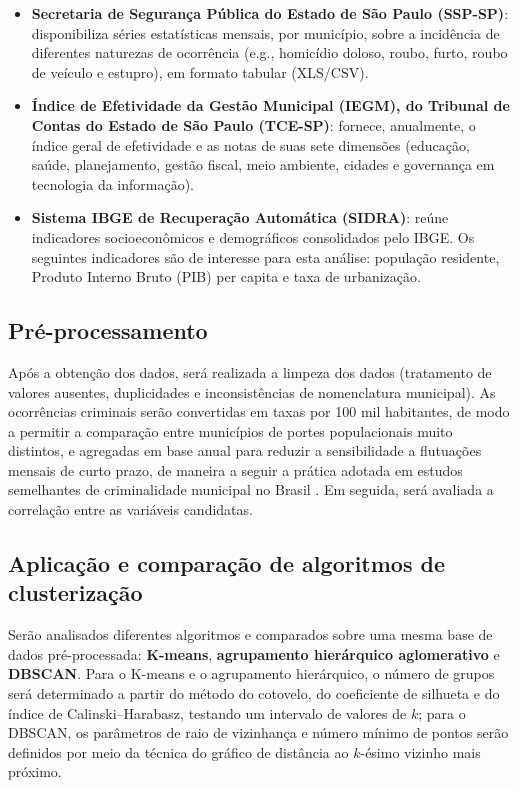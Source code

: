 \documentclass[12pt]{article}
\begin{document}
\begin{itemize}
\item \textbf{Secretaria de Segurança Pública do Estado de São Paulo (SSP-SP)}: disponibiliza séries estatísticas mensais, por município, sobre a incidência de diferentes naturezas de ocorrência (e.g., homicídio doloso, roubo, furto, roubo de veículo e estupro), em formato tabular (XLS/CSV).

\item \textbf{Índice de Efetividade da Gestão Municipal (IEGM), do Tribunal de Contas do Estado de São Paulo (TCE-SP)}: fornece, anualmente, o índice geral de efetividade e as notas de suas sete dimensões (educação, saúde, planejamento, gestão fiscal, meio ambiente, cidades e governança em tecnologia da informação).

\item \textbf{Sistema IBGE de Recuperação Automática (SIDRA)}: reúne indicadores socioeconômicos e demográficos consolidados pelo IBGE. Os seguintes indicadores são de interesse para esta análise:  população residente, Produto Interno Bruto (PIB) per capita e taxa de urbanização.

\end{itemize}

\subsection{Pré-processamento}
Após a obtenção dos dados, será realizada a limpeza dos dados (tratamento de valores ausentes, duplicidades e inconsistências de nomenclatura municipal). As ocorrências criminais serão convertidas em taxas por 100 mil habitantes, de modo a permitir a comparação entre municípios de portes populacionais muito distintos, e agregadas em base anual para reduzir a sensibilidade a flutuações mensais de curto prazo, de maneira a seguir a prática adotada em estudos semelhantes de criminalidade municipal no Brasil \cite{soaresfilho2024}. Em seguida, será avaliada a correlação entre as variáveis candidatas.

\subsection{Aplicação e comparação de algoritmos de clusterização}
Serão analisados diferentes algoritmos e comparados sobre uma mesma base de dados pré-processada: \textbf{K-means}, \textbf{agrupamento hierárquico aglomerativo} e \textbf{DBSCAN}. Para o K-means e o agrupamento hierárquico, o número de grupos será determinado a partir do método do cotovelo, do coeficiente de silhueta e do índice de Calinski--Harabasz, testando um intervalo de valores de $k$; para o DBSCAN, os parâmetros de raio de vizinhança e número mínimo de pontos serão definidos por meio da técnica do gráfico de distância ao $k$-ésimo vizinho mais próximo. 
\end{document}

